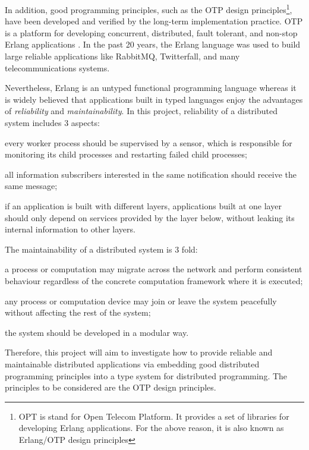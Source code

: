 In addition, good programming principles, such as the OTP design principles\footnote{OPT is stand for Open Telecom Platform.  It provides a set of libraries for developing Erlang applications.  For the above reason, it is also known as Erlang/OTP design principles}, have been developed and verified by the long-term implementation practice.  OTP is a platform for developing concurrent, distributed, fault tolerant, and non-stop Erlang applications \cite{Erlang}.  In the past 20 years, the Erlang language was used to build large reliable applications like RabbitMQ, Twitterfall, and many telecommunications systems.

Nevertheless, Erlang is an untyped functional programming language whereas it is widely believed that applications built in typed languages enjoy the advantages of {\it{reliability}} and {\it{maintainability}}.  In this project, reliability of a distributed system includes 3 aspects:
\begin{inparaenum}
\item every worker process should be supervised by a sensor, which is responsible for monitoring its child processes and restarting failed child processes;
\item all information subscribers interested in the same notification should receive the same message;
\item if an application is built with different layers, applications built at one layer should only depend on services provided by the layer below, without leaking its internal information to other layers.   
\end{inparaenum}
The maintainability of a distributed system is 3 fold:
\begin{inparaenum}[i)]
\item a process or computation may migrate across the network and perform consistent behaviour regardless of the concrete computation framework where it is executed;
\item any process or computation device may join or leave the system peacefully without affecting the rest of the system;
\item the system should be developed in a modular way.    
\end{inparaenum}

Therefore, this project will aim to investigate how to provide reliable and maintainable distributed applications via embedding good distributed programming principles into a type system  for distributed programming.  The principles to be considered are the OTP design principles.

